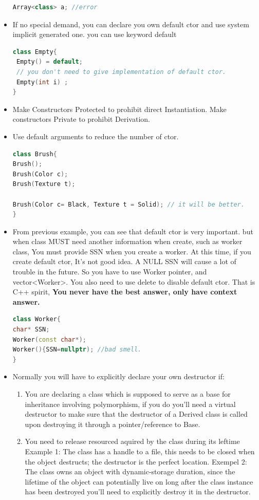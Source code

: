 \documentclass[a4paper,12pt,twoside]{book}
\begin{document}
\begin{itemize}
\begin{lstlisting}[frame=single, language=c++]
Array<class> a; //error
\end{lstlisting}

\item If no special demand, you can declare you own default ctor and use system implicit generated one. you can use keyword default
\begin{lstlisting}[frame=single, language=c++]
class Empty{
 Empty() = default;
 // you don't need to give implementation of default ctor.
 Empty(int i) ;
}
\end{lstlisting}


\item Make Constructors Protected to prohibit direct Instantiation. Make constructors Private to prohibit Derivation.

\item Use default arguments to reduce the number of ctor.
\begin{lstlisting}[frame=single, language=c++]
class Brush{
Brush();
Brush(Color c);
Brush(Texture t);

Brush(Color c= Black, Texture t = Solid); // it will be better.
}
\end{lstlisting}


\item From previous example, you can see that default ctor is very important. but when class MUST need another information when create, such as  worker class, You must provide SSN when you create a worker.
At this time, if you create default ctor, It's not good idea. A NULL SSN will cause a lot of trouble in the future.  So you have to use Worker pointer, and vector<Worker>.  You also need to use delete to disable default ctor.
That is C++ spirit, \textbf{You never have the best answer, only have context answer. }
\begin{lstlisting}[frame=single, language=c++]
class Worker{
char* SSN;
Worker(const char*);
Worker(){SSN=nullptr); //bad smell.
}
\end{lstlisting}

\item Normally you will have to explicitly declare your own destructor if:
\begin{enumerate}
\item You are declaring a class which is supposed to serve as a base for inheritance involving polymorphism, if you do you'll need a virtual destructor to make sure that the destructor of a Derived class is called upon destroying it through a pointer/reference to Base.
\item You need to release resourced aquired by the class during its leftime
Example 1: The class has a handle to a file, this needs to be closed when the object destructs; the destructor is the perfect location.
Exempel 2: The class owns an object with dynamic-storage duration, since the lifetime of the object can potentially live on long after the class instance has been destroyed you'll need to explicitly destroy it in the destructor.
\end{enumerate}



\end{itemize}
\end{document}
